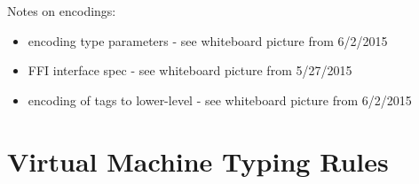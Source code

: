 \documentclass{article}
\begin{document}
Notes on encodings:

\begin{itemize}

\item encoding type parameters - see whiteboard picture from 6/2/2015

\item FFI interface spec - see whiteboard picture from 5/27/2015

\item encoding of tags to lower-level - see whiteboard picture from 6/2/2015

\end{itemize}

\section{Virtual Machine Typing Rules}
\end{document}
